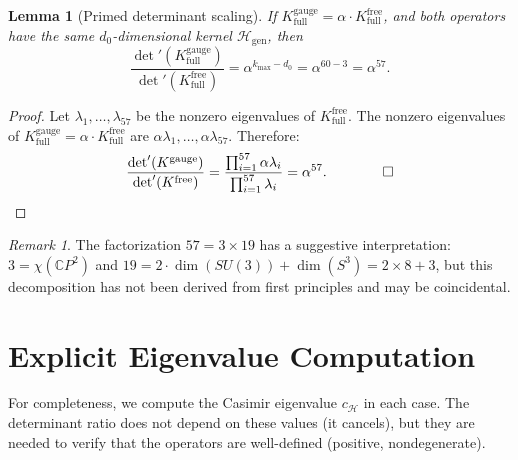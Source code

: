 \documentclass[11pt]{article}
\newtheorem{lemma}[theorem]{Lemma}
\theoremstyle{definition}
\theoremstyle{remark}
\newtheorem*{remark}{Remark}
\newcommand{\CP}{\mathbb{C}P}
\begin{document}
\begin{lemma}[Primed determinant scaling]
\label{lem:primed}
If $K^{\mathrm{gauge}}_{\mathrm{full}} = \alpha \cdot
K^{\mathrm{free}}_{\mathrm{full}}$, and both operators have the same
$d_0$-dimensional kernel $\mathcal{H}_{\mathrm{gen}}$, then
\begin{equation}
\frac{\det'(K^{\mathrm{gauge}}_{\mathrm{full}})}
     {\det'(K^{\mathrm{free}}_{\mathrm{full}})}
= \alpha^{k_{\max} - d_0} = \alpha^{60 - 3} = \alpha^{57}.
\end{equation}
\end{lemma}

\begin{proof}
Let $\lambda_1, \ldots, \lambda_{57}$ be the nonzero eigenvalues of
$K^{\mathrm{free}}_{\mathrm{full}}$. The nonzero eigenvalues of
$K^{\mathrm{gauge}}_{\mathrm{full}} = \alpha \cdot
K^{\mathrm{free}}_{\mathrm{full}}$ are $\alpha \lambda_1, \ldots,
\alpha \lambda_{57}$. Therefore:
\begin{equation}
\frac{\det'(K^{\mathrm{gauge}})}{\det'(K^{\mathrm{free}})}
= \frac{\prod_{i=1}^{57} \alpha \lambda_i}{\prod_{i=1}^{57} \lambda_i}
= \alpha^{57}. \qquad \qed
\end{equation}
\end{proof}

\begin{remark}
The factorization $57 = 3 \times 19$ has a suggestive interpretation:
$3 = \chi(\CP^2)$ and $19 = 2 \cdot \dim(SU(3)) + \dim(S^3) =
2 \times 8 + 3$, but this decomposition has not been derived from first
principles and may be coincidental.
\end{remark}


\section{Explicit Eigenvalue Computation}
\label{sec:eigenvalues}

For completeness, we compute the Casimir eigenvalue $c_{\mathcal{H}}$
in each case. The determinant ratio does not depend on these values
(it cancels), but they are needed to verify that the operators are
well-defined (positive, nondegenerate).
\end{document}
